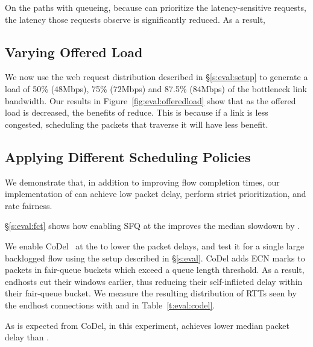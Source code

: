 On the paths with queueing, because \name can prioritize the latency-sensitive requests, the latency those requests observe is significantly reduced. As a result, 



\begin{Appendix}
\section{Varying Offered Load}\label{s:eval:offeredload}
We now use the web request distribution described in \S\ref{s:eval:setup} to generate a load of 50\% ($48$Mbps), 75\% ($72$Mbps) and 87.5\% ($84$Mbps) of the bottleneck link bandwidth. Our results in Figure~\ref{fig:eval:offeredload} show that as the offered load is decreased, the benefits of \name reduce. This is because if a link is less congested, scheduling the packets that traverse it will have less benefit.


\end{Appendix}

\subsection{Applying Different Scheduling Policies}\label{s:eval:policies}
We demonstrate that, in addition to improving flow completion times, our implementation of \name can achieve low packet delay, perform strict prioritization, and rate fairness.

 \S\ref{s:eval:fct} shows how enabling SFQ at the \name improves the median slowdown by \overviewBenefitsBundlerMedianImprovement.

We enable CoDel~\cite{fq-codel} at the \inbox to lower the packet delays, and test it for a single large backlogged flow using the setup described in \S\ref{s:eval}.
CoDel adds ECN marks to packets in fair-queue buckets which exceed a queue length threshold. 
As a result, endhosts cut their windows earlier, thus reducing their self-inflicted delay within their fair-queue bucket.
We measure the resulting distribution of RTTs seen by the endhost connections with \name and \baseline in Table~\ref{t:eval:codel}.

As is expected from CoDel, \name in this experiment, achieves \delaysImprovement lower median packet delay than \baseline.

